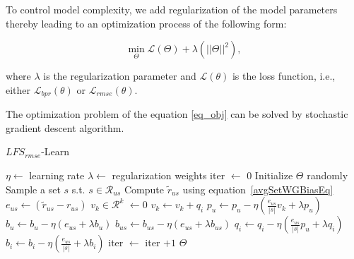 To control model complexity, we add regularization of the model parameters
thereby leading to an optimization process of the following form:

%
\begin{equation} \label{eq_obj}
  \min_{\Theta} \mathcal{L}(\Theta)  + \lambda (||\Theta||^2),
\end{equation}

%
\noindent where $\lambda$ is the regularization parameter and
$\mathcal{L}(\theta)$ is the loss function, i.e., either $\mathcal{L}_{bpr}(\theta)$ or
$\mathcal{L}_{rmse}(\theta)$.


The optimization problem of the equation \ref{eq_obj} can be solved by stochastic
gradient descent algorithm.


\begin{algorithm}[t]
  \caption{$LFS_{rmse}$-Learn}
  \label{alg-lfs-rmse}
  \begin{algorithmic}[1]
      \State $\eta \gets$ learning rate
      \State $\lambda \gets$ regularization weights
      \State iter $\gets$ 0
      \State Initialize $\Theta$ randomly
          \State Sample a set $s$ s.t. $s \in \mathcal{R}_{us}$ 
          \State Compute $\tilde{r}_{us} $ using equation~\ref{avgSetWGBiasEq}
          \State $e_{us} \gets (\tilde{r}_{us} - r_{us})$
          \State $v_k \in \mathcal{R}^k$  $\gets 0$
            \State $v_k \gets v_k + q_i$
          \EndFor
          \State $p_u \gets p_u - \eta(\frac{e_{us}}{|s|} v_k + \lambda p_u)$
          \State $b_u \gets b_u - \eta(e_{us} + \lambda b_u)$
          \State $b_{us} \gets b_{us} - \eta(e_{us} + \lambda b_{us})$
            \State $q_i \gets q_i - \eta(\frac{e_{us}}{|s|} p_u + \lambda q_i)$  
            \State $b_i \gets b_i - \eta(\frac{e_{us}}{|s|} + \lambda b_i)$
          \EndFor
        \EndFor
        \State iter $\gets $ iter $ + 1$
      \EndWhile
      \State \Return $\Theta$
    \EndProcedure
  \end{algorithmic}
\end{algorithm}


